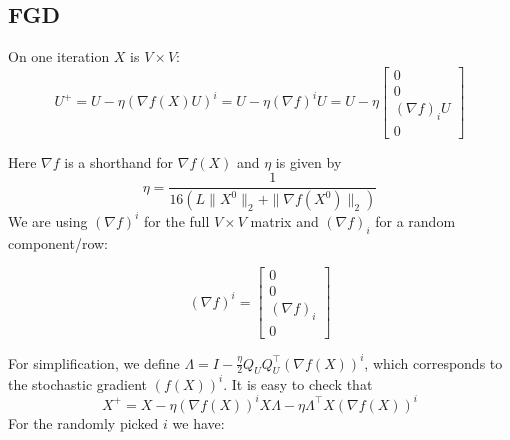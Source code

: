 \documentclass[letterpaper]{article} %
\begin{document}
\subsection{FGD}
On one iteration $X$ is $V \times V$:
$$U^+=U-\eta (\nabla f(X)U)^i= U-\eta (\nabla f)^iU=U-\eta\begin{bmatrix}
    0 \\
    0 \\
	(\nabla f)_iU\\    
    0 
\end{bmatrix}$$

Here $\nabla f$ is a shorthand for $\nabla f(X)$ and $\eta$ is given by
\[
\eta=\frac{1}{16(L\|X^0\|_2+\|\nabla f(X^0)\|_2)}
\]
 We are using $(\nabla f)^i$ for the full $V\times V$ matrix and $(\nabla f)_i$ for a random component/row:

$$(\nabla f)^i=\begin{bmatrix}
0 \\
0 \\
(\nabla f)_i\\    
0 
\end{bmatrix}$$


For simplification, we define $\Lambda=I-\frac{\eta}{2}Q_UQ_U^\top(\nabla f(X))^i$, which corresponds to the stochastic gradient $(f(X))^i$. It is easy to check that 
\begin{equation}
X^+=X-\eta(\nabla f(X))^iX\Lambda-\eta\Lambda^\top X(\nabla f(X))^i
\end{equation}
For the randomly picked $i$ we have:
\end{document}
